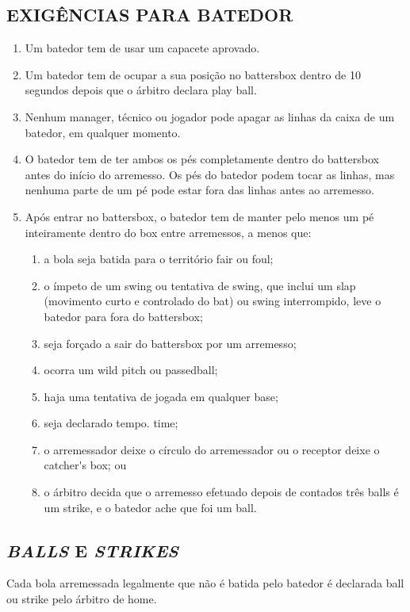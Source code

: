 \subsection{EXIGÊNCIAS PARA BATEDOR}
\begin{enumerate}[label=(\alph*)]
	\item   Um batedor tem de usar um capacete aprovado.
	\item  Um batedor tem de ocupar a sua posição no \gls{battersbox} dentro de 10 segundos depois que o árbitro declara \gls{play ball}.
	\item  Nenhum manager, técnico ou jogador pode apagar as linhas da caixa de um batedor, em qualquer momento.
	\item  O batedor tem de ter ambos os pés completamente dentro do \gls{battersbox} antes do início do arremesso. Os pés do batedor podem tocar as linhas, mas nenhuma parte de um pé pode estar fora das linhas antes ao arremesso.
	\item  Após entrar no \gls{battersbox}, o batedor tem de manter pelo menos um pé inteiramente dentro do \gls{box} entre arremessos, a menos que:

	 \begin{enumerate}[label=\roman*.]
	 	\item a bola seja batida para o território \gls{fair} ou \gls{foul};
	\item o ímpeto de um \gls{swing} ou tentativa de \gls{swing}, que inclui um \gls{slap} (movimento curto e controlado do \gls{bat}) ou \gls{swing} interrompido, leve o batedor para fora do \gls{battersbox};
	\item  seja forçado a sair do \gls{battersbox} por um arremesso;
	\item  ocorra um \gls{wild pitch} ou \gls{passedball};
	\item  haja uma tentativa de jogada em qualquer base;
	\item  seja declarado tempo. \gls{time};
	\item  o arremessador deixe o círculo do arremessador ou o receptor deixe o \gls{catcher's box}; ou
	\item  o árbitro decida que o arremesso efetuado depois de contados três \glspl{ball} é um \gls{strike}, e o batedor ache que foi um \gls{ball}.
	\end{enumerate}

\end{enumerate}
\subsection{\textit{BALLS} E \textit{STRIKES}}
 Cada bola arremessada legalmente que não é batida pelo batedor é declarada \gls{ball} ou \gls{strike} pelo árbitro de \gls{home}.

